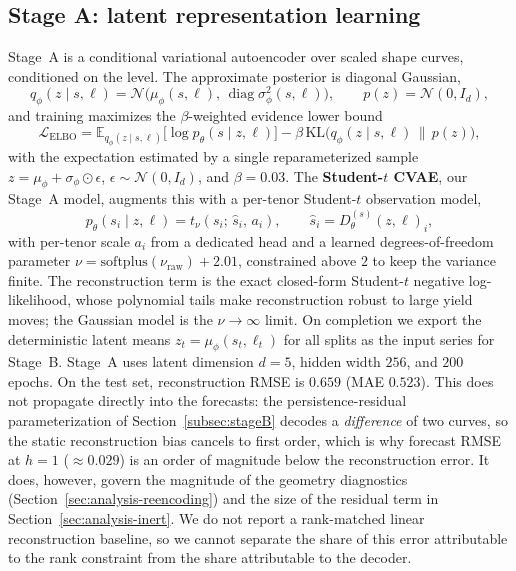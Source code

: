 \documentclass{article} %
\begin{document}
\subsection{Stage A: latent representation learning}
\label{subsec:stageA}
Stage~A is a conditional variational autoencoder over scaled shape curves,
conditioned on the level. The approximate posterior is diagonal Gaussian,
\begin{equation}
  q_\phi(z \mid s, \ell) = \mathcal{N}\!\big(\mu_\phi(s,\ell),\,
  \operatorname{diag}\sigma_\phi^2(s,\ell)\big),
  \qquad p(z) = \mathcal{N}(0, I_d),
\end{equation}
and training maximizes the $\beta$-weighted evidence lower bound
\begin{equation}
  \mathcal{L}_{\mathrm{ELBO}}
  = \mathbb{E}_{q_\phi(z\mid s,\ell)}\big[\log p_\theta(s \mid z, \ell)\big]
  - \beta\, \mathrm{KL}\!\big(q_\phi(z \mid s,\ell)\,\|\,p(z)\big),
\end{equation}
with the expectation estimated by a single reparameterized sample
$z = \mu_\phi + \sigma_\phi \odot \epsilon$, $\epsilon \sim \mathcal{N}(0,I_d)$,
and $\beta = 0.03$.
The \textbf{Student-$t$ CVAE}, our Stage~A model, augments this with a per-tenor
Student-$t$ observation model,
\begin{equation}
  p_\theta(s_i \mid z, \ell) = t_{\nu}\!\left(s_i;\, \hat{s}_i,\, a_i\right),
  \qquad \hat{s}_i = D_\theta^{(s)}(z, \ell)_i,
\end{equation}
with per-tenor scale $a_i$ from a dedicated head and a learned degrees-of-freedom
parameter $\nu = \mathrm{softplus}(\nu_{\mathrm{raw}}) + 2.01$, constrained above
$2$ to keep the variance finite. The reconstruction term is the exact closed-form
Student-$t$ negative log-likelihood, whose polynomial tails make reconstruction
robust to large yield moves; the Gaussian model is the $\nu\to\infty$ limit. On
completion we export the deterministic latent means $z_t=\mu_\phi(s_t,\ell_t)$ for
all splits as the input series for Stage~B.
Stage~A uses latent dimension $d{=}5$, hidden width $256$, and $200$ epochs. On the
test set, reconstruction RMSE is $0.659$ (MAE $0.523$). This does not propagate
directly into the forecasts: the persistence-residual parameterization of
Section~\ref{subsec:stageB} decodes a \emph{difference} of two curves, so the static
reconstruction bias cancels to first order, which is why forecast RMSE at $h{=}1$
($\approx 0.029$) is an order of magnitude below the reconstruction error. It does,
however, govern the magnitude of the geometry diagnostics
(Section~\ref{sec:analysis-reencoding}) and the size of the residual term in
Section~\ref{sec:analysis-inert}. We do not report a rank-matched linear
reconstruction baseline, so we cannot separate the share of this error attributable
to the rank constraint from the share attributable to the decoder.
\end{document}
